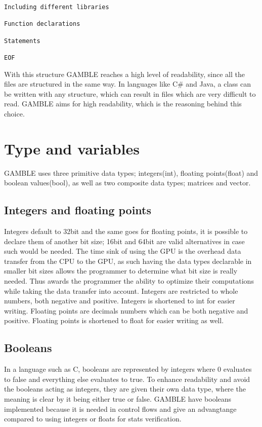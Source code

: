 \begin{lstlisting}[caption={The structure of GABMLE files},label={lst:Structure}]
Including different libraries

Function declarations

Statements

EOF
\end{lstlisting}

With this structure GAMBLE reaches a high level of readability, since all the files are structured in the same way.
In languages like C\# and Java, a class can be written with any structure, which can result in files which are very difficult to read.
GAMBLE aims for high readability, which is the reasoning behind this choice.

\section{Type and variables}
GAMBLE uses three primitive data types; integers(int), floating points(float) and boolean values(bool), as well as two composite data types; matrices and vector.

\subsection{Integers and floating points}
Integers default to 32bit and the same goes for floating points, it is possible to declare them of another bit size; 16bit and 64bit are valid alternatives in case such would be needed.%
The time sink of using the GPU is the overhead data transfer from the CPU to the GPU, as such having the data types declarable in smaller bit sizes allows the programmer to determine what bit size is really needed.
Thus awards the programmer the ability to optimize their computations while taking the data transfer into account.
Integers are restricted to whole numbers, both negative and positive.
Integers is shortened to int for easier writing.
Floating points are decimals numbers which can be both negative and positive.
Floating points is shortened to float for easier writing as well.

\subsection{Booleans}
In a language such as C, booleans are represented by integers where 0 evaluates to false and everything else evaluates to true.
To enhance readability and avoid the booleans acting as integers, they are given their own data type, where the meaning is clear by it being either true or false.
GAMBLE have booleans implemented because it is needed in control flows and give an advangtange compared to using integers or floats for stats verification.   

